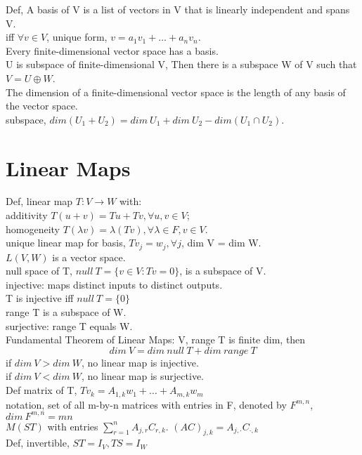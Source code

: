 \documentclass[paper=a4, fontsize=11pt]{scrartcl} %
\numberwithin{equation}{section} %
\numberwithin{figure}{section} %
\numberwithin{table}{section} %
\begin{document}
Def, A basis of V is a list of vectors in V that is linearly independent and spans V.\\
iff $\forall v\in V$, unique form, $v=a_1v_1+\dots+a_nv_n$. \\
Every finite-dimensional vector space has a basis.\\
U is subspace of finite-dimensional V, Then there is a subspace W of V such that $V=U\oplus W$.\\
The dimension of a finite-dimensional vector space is the length of any basis of the vector space.\\
subspace, $dim(U_1+U_2) = dim\ U_1 +dim\ U_2 - dim(U_1\cap U_2)$.


\section{Linear Maps}
Def, linear map $T:V\rightarrow W$ with:\\
additivity $T(u+v)=Tu+Tv, \forall u,v\in V$;\\
homogeneity $T(\lambda v) = \lambda (Tv), \forall \lambda\in F, v\in V$.\\
unique linear map for basis, $Tv_j = w_j,\forall j$, dim V = dim W.\\
$L(V,W)$ is a vector space.\\
null space of T, $null\ T = \{v\in V: Tv=0\}$, is a subspace of V.\\
injective: maps distinct inputs to distinct outputs.\\
T is injective iff $null\ T =\{0\}$\\
range T is a subspace of W.\\
surjective: range T equals W.\\
Fundamental Theorem of Linear Maps: V, range T is finite dim, then 
\begin{equation}
dim\ V = dim\ null\ T + dim\ range\ T
\end{equation}
if $dim\ V > dim\ W$, no linear map is injective.\\
if $dim\ V < dim\ W$, no linear map is surjective.\\
Def matrix of T,  $Tv_k = A_{1,k}w_1+\dots+A_{m,k} w_m$\\
notation, set of all m-by-n matrices with entries in F, denoted by $F^{m,n}$, $dim\ F^{m,n} = mn$\\
$M(ST)$ with entries $\sum_{r=1}^n A_{j,r}C_{r,k}$. $(AC)_{j,k}=A_{j,\cdot} C_{\cdot,k}$\\
Def, invertible, $ST=I_V, TS=I_W$\\
\end{document}

